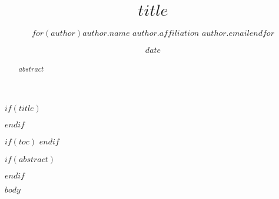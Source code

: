 \documentclass[$if(lang)$$lang$,$endif$]{tufte-handout}
\title{$title$}
\author{$for(author)$\Large $author.name$\vspace{0.05in} \newline\normalsize $author.affiliation$ \newline\footnotesize $author.email$\vspace*{0.2in}\newline $endfor$}
\date{$date$}
\begin{document}
$if(title)$
\maketitle
$endif$

$if(toc)$
{
\hypersetup{linkcolor=black}
\setcounter{tocdepth}{$toc-depth$}
\tableofcontents
}
$endif$

$if(abstract)$
\begin{abstract}
\noindent $abstract$
\end{abstract}
$endif$

$body$



\end{document}
